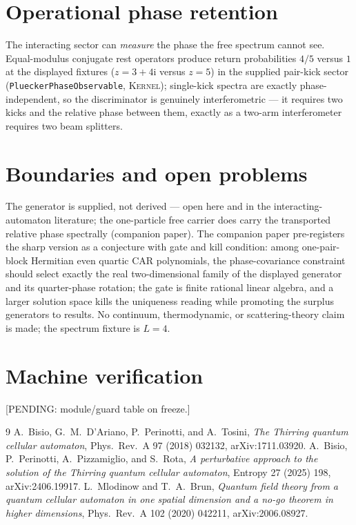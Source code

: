 \documentclass[11pt]{article}
\newcommand{\ii}{\mathrm{i}}
\newcommand{\Kernel}{\textcolor{kernelcolor}{\textsc{Kernel}}}
\begin{document}
\section{Operational phase retention}

The interacting sector can \emph{measure} the phase the free spectrum
cannot see.  Equal-modulus conjugate rest operators
produce return probabilities $4/5$ versus $1$ at the displayed fixtures
($z=3+4\ii$ versus $z=5$) in the supplied pair-kick
sector (\texttt{PlueckerPhaseObservable}, \Kernel{}); single-kick
spectra are exactly phase-independent, so the discriminator is genuinely
interferometric --- it requires two kicks and the relative phase between
them, exactly as a two-arm interferometer requires two beam splitters.

\section{Boundaries and open problems}
The generator is supplied, not derived --- open here and in the
interacting-automaton literature; the one-particle free carrier does
carry the transported relative phase spectrally (companion paper).
The companion paper pre-registers the sharp version as a conjecture
with gate and kill condition: among one-pair-block Hermitian even
quartic CAR polynomials, the phase-covariance constraint should select
exactly the real two-dimensional family of the displayed generator and
its quarter-phase rotation; the gate is finite rational linear algebra,
and a larger solution space kills the uniqueness reading while
promoting the surplus generators to results.
No continuum, thermodynamic, or scattering-theory claim is made; the
spectrum fixture is $L=4$.

\appendix
\section{Machine verification}
[PENDING: module/guard table on freeze.]

\begin{thebibliography}{9}
A.~Bisio, G.~M.~D'Ariano, P.~Perinotti, and A.~Tosini,
\emph{The Thirring quantum cellular automaton},
Phys.\ Rev.\ A 97 (2018) 032132, arXiv:1711.03920.
A.~Bisio, P.~Perinotti, A.~Pizzamiglio, and S.~Rota,
\emph{A perturbative approach to the solution of the Thirring quantum
cellular automaton}, Entropy 27 (2025) 198, arXiv:2406.19917.
L.~Mlodinow and T.~A.~Brun,
\emph{Quantum field theory from a quantum cellular automaton in one
spatial dimension and a no-go theorem in higher dimensions},
Phys.\ Rev.\ A 102 (2020) 042211, arXiv:2006.08927.
\end{thebibliography}
\end{document}
